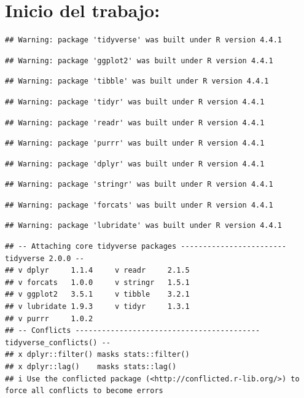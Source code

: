 \documentclass[
]{article}
\begin{document}
\section{Inicio del trabajo:}\label{inicio-del-trabajo}

\begin{verbatim}
## Warning: package 'tidyverse' was built under R version 4.4.1
\end{verbatim}

\begin{verbatim}
## Warning: package 'ggplot2' was built under R version 4.4.1
\end{verbatim}

\begin{verbatim}
## Warning: package 'tibble' was built under R version 4.4.1
\end{verbatim}

\begin{verbatim}
## Warning: package 'tidyr' was built under R version 4.4.1
\end{verbatim}

\begin{verbatim}
## Warning: package 'readr' was built under R version 4.4.1
\end{verbatim}

\begin{verbatim}
## Warning: package 'purrr' was built under R version 4.4.1
\end{verbatim}

\begin{verbatim}
## Warning: package 'dplyr' was built under R version 4.4.1
\end{verbatim}

\begin{verbatim}
## Warning: package 'stringr' was built under R version 4.4.1
\end{verbatim}

\begin{verbatim}
## Warning: package 'forcats' was built under R version 4.4.1
\end{verbatim}

\begin{verbatim}
## Warning: package 'lubridate' was built under R version 4.4.1
\end{verbatim}

\begin{verbatim}
## -- Attaching core tidyverse packages ------------------------ tidyverse 2.0.0 --
## v dplyr     1.1.4     v readr     2.1.5
## v forcats   1.0.0     v stringr   1.5.1
## v ggplot2   3.5.1     v tibble    3.2.1
## v lubridate 1.9.3     v tidyr     1.3.1
## v purrr     1.0.2     
## -- Conflicts ------------------------------------------ tidyverse_conflicts() --
## x dplyr::filter() masks stats::filter()
## x dplyr::lag()    masks stats::lag()
## i Use the conflicted package (<http://conflicted.r-lib.org/>) to force all conflicts to become errors
\end{verbatim}
\end{document}
